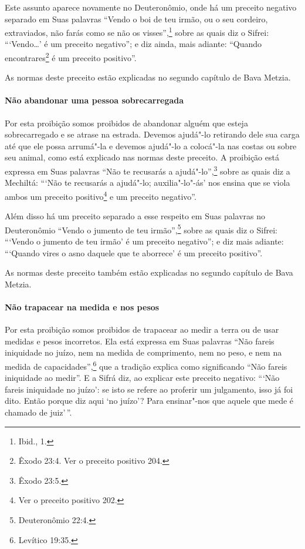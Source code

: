 \begin{multicols}{2}
Este assunto aparece novamente no Deuteronômio, onde há um preceito
negativo separado em Suas palavras ``Vendo o boi de teu irmão, ou o seu
cordeiro, extraviados, não farás como se não os visses'',\footnote{Ibid., 1.}
sobre as quais diz o Sifrei\starr: ```Vendo\ldots{}' é um preceito negativo''; e
diz ainda, mais adiante: ``Quando encontrares\footnote{Êxodo
23:4. Ver o preceito positivo 204.} é um preceito positivo''.

As normas deste preceito estão explicadas no segundo capítulo de Bava Metzia\starr.

\paragraph{Não abandonar uma pessoa sobrecarregada}

Por esta proibição somos proibidos de abandonar alguém que esteja
sobrecarregado e se atrase na estrada. Devemos ajudá"-lo retirando dele
sua carga até que ele possa arrumá"-la e devemos ajudá"-lo a colocá"-la nas
costas ou sobre seu animal, como está explicado nas normas deste
preceito. A proibição está expressa em Suas palavras ``Não te recusarás
a ajudá"-lo'',\footnote{Êxodo 23:5.} sobre as quais diz a Mechiltá\starr: ```Não te recusarás a ajudá"-lo;
auxilia"-lo"-ás' nos ensina que se viola ambos um preceito
positivo\footnote{Ver o preceito positivo 202.} e um preceito negativo''.

Além disso há um preceito separado a esse respeito em Suas palavras no
Deuteronômio ``Vendo o jumento de teu irmão'',\footnote{Deuteronômio 22:4.} sobre
as quais diz o Sifrei\starr: ```Vendo o jumento de teu irmão' é um preceito
negativo''; e diz mais adiante: ```Quando vires o asno daquele que te
aborrece' é um preceito positivo''.

As normas deste preceito também estão explicadas no segundo capítulo de
Bava Metzia\starr.

\paragraph{Não trapacear na medida e nos pesos}

Por esta proibição somos proibidos de trapacear ao medir a terra ou de
usar medidas e pesos incorretos. Ela está expressa em Suas palavras
``Não fareis iniquidade no juízo, nem na medida de comprimento, nem no
peso, e nem na medida de capacidades'',\footnote{Levítico 19:35.} que a tradição
explica como significando ``Não fareis iniquidade ao medir''. E a Sifrá\starr{}
diz, ao explicar este preceito negativo: ```Não fareis iniquidade no
juízo': se isto se refere ao proferir um julgamento, isso já foi dito.
Então porque diz aqui `no juízo'? Para ensinar"-nos que aquele que mede é
chamado de juiz'\,''.


\end{multicols}
